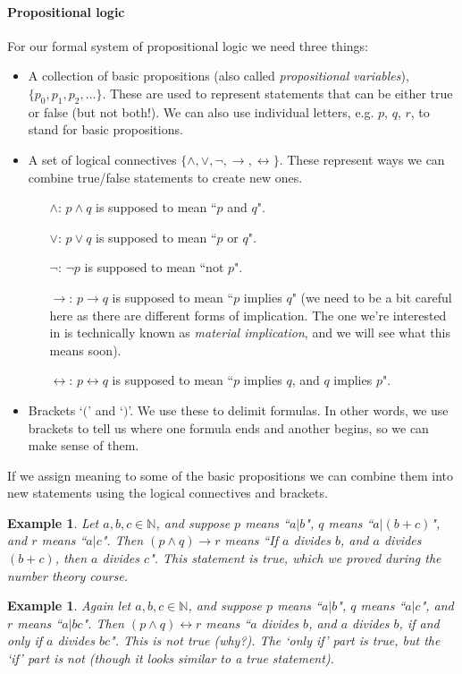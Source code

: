 \documentclass{article}
\theoremstyle{plain}
\newtheorem{example}[theorem]{Example}{\bfseries}{\upshape}
\newcommand{\bN}{\mathbb{N}}
\begin{document}
\paragraph{Propositional logic}
For our formal system of propositional logic we need three things:
\begin{itemize}
\item A collection of basic propositions (also called \emph{propositional variables}),  $\{p_0,p_1,p_2,\ldots\}$. These are used to represent statements that can be either true or false (but not both!). We can also use individual letters, e.g. $p$, $q$, $r$, to stand for basic propositions.
\item A set of logical connectives $\{\wedge,\vee,\neg,\rightarrow,\leftrightarrow\}$. These represent ways we can combine true/false statements to create new ones.
\begin{itemize}
\item[$\wedge$:] $p\wedge q$ is supposed to mean ``$p$ and $q$". 
\item[$\vee$:] $p\vee q$ is supposed to mean ``$p$ or $q$".
\item[$\neg$:] $\neg p$ is supposed to mean ``not $p$".
\item[$\rightarrow$:] $p\rightarrow q$ is supposed to mean ``$p$ implies $q$" (we need to be a bit careful here as there are different forms of implication. The one we're interested in is technically known as \emph{material implication}, and we will see what this means soon).
\item[$\leftrightarrow$:] $p\leftrightarrow q$ is supposed to mean ``$p$ implies $q$, and $q$ implies $p$".
\end{itemize}
\item Brackets `$($' and `$)$'. We use these to delimit formulas. In other words, we use brackets to tell us where one formula ends and another begins, so we can make sense of them.
\end{itemize}
If we assign meaning to some of the basic propositions we can combine them into new statements using the logical connectives and brackets.
\begin{example}
Let $a,b,c\in \bN$, and suppose  $p$ means ``$a|b$", $q$ means ``$a|(b+c)$", and $r$ means ``$a|c$". Then $(p\wedge q)\rightarrow r$ means ``If $a$ divides $b$, and $a$ divides $(b+c)$, then $a$ divides $c$". This statement is true, which we proved during the number theory course.
\end{example} 

\begin{example}
Again let $a,b,c\in \bN$, and suppose $p$ means ``$a|b$", $q$ means ``$a|c$", and $r$ means ``$a|bc$". Then $(p\wedge q)\leftrightarrow r$ means ``$a$ divides $b$, and $a$ divides $b$, if and only if $a$ divides $bc$". This is not true (why?). The `only if' part is true, but the `if' part is not (though it looks similar to a true statement). 
\end{example}
\end{document}
